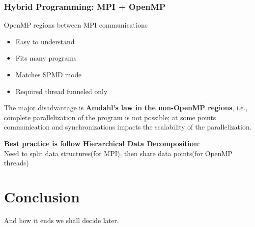 \documentclass[12pt, a4paper]{report}
\begin{document}
\subsection{Hybrid Programming: MPI + OpenMP}
OpenMP regions between MPI communications
\begin{itemize}
    \item Easy to understand
    \item Fits many programs
    \item Matches SPMD mode
    \item Required thread funneled only
\end{itemize}

The major disadvantage is {\bfseries{Amdahl's law in the non-OpenMP regions}}, i.e., complete parallelization of the program is not possible; at some points 
communication and synchronizations impacts the scalability of the parallelization.

{\bfseries{Best practice is follow Hierarchical Data Decomposition}}: \\
Need to split data structures(for MPI), then share data points(for OpenMP threads)

  


    




    







\chapter*{Conclusion}
And how it ends we shall decide later.





\newpage
\begin{thebibliography}{3}
  
\end{thebibliography}
\end{document}
